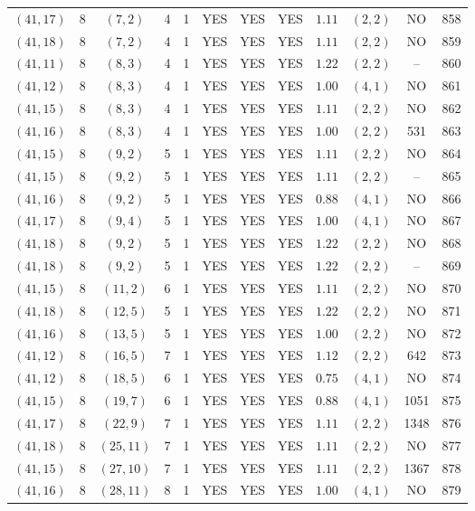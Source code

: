 \begin{longtable}{|c|c|c|c|c|c|c|c|c|c|c|c|}
$(41,17)$ & 8 & $(7,2)$ & 4 & 1 & YES & YES & YES & $1.11$ & $(2,2)$ & NO & 858\\
$(41,18)$ & 8 & $(7,2)$ & 4 & 1 & YES & YES & YES & $1.11$ & $(2,2)$ & NO & 859\\
$(41,11)$ & 8 & $(8,3)$ & 4 & 1 & YES & YES & YES & $1.22$ & $(2,2)$ & -- & 860\\
$(41,12)$ & 8 & $(8,3)$ & 4 & 1 & YES & YES & YES & $1.00$ & $(4,1)$ & NO & 861\\
$(41,15)$ & 8 & $(8,3)$ & 4 & 1 & YES & YES & YES & $1.11$ & $(2,2)$ & NO & 862\\
$(41,16)$ & 8 & $(8,3)$ & 4 & 1 & YES & YES & YES & $1.00$ & $(2,2)$ & 531 & 863\\
$(41,15)$ & 8 & $(9,2)$ & 5 & 1 & YES & YES & YES & $1.11$ & $(2,2)$ & NO & 864\\
$(41,15)$ & 8 & $(9,2)$ & 5 & 1 & YES & YES & YES & $1.11$ & $(2,2)$ & -- & 865\\
$(41,16)$ & 8 & $(9,2)$ & 5 & 1 & YES & YES & YES & $0.88$ & $(4,1)$ & NO & 866\\
$(41,17)$ & 8 & $(9,4)$ & 5 & 1 & YES & YES & YES & $1.00$ & $(4,1)$ & NO & 867\\
$(41,18)$ & 8 & $(9,2)$ & 5 & 1 & YES & YES & YES & $1.22$ & $(2,2)$ & NO & 868\\
$(41,18)$ & 8 & $(9,2)$ & 5 & 1 & YES & YES & YES & $1.22$ & $(2,2)$ & -- & 869\\
$(41,15)$ & 8 & $(11,2)$ & 6 & 1 & YES & YES & YES & $1.11$ & $(2,2)$ & NO & 870\\
$(41,18)$ & 8 & $(12,5)$ & 5 & 1 & YES & YES & YES & $1.22$ & $(2,2)$ & NO & 871\\
$(41,16)$ & 8 & $(13,5)$ & 5 & 1 & YES & YES & YES & $1.00$ & $(2,2)$ & NO & 872\\
$(41,12)$ & 8 & $(16,5)$ & 7 & 1 & YES & YES & YES & $1.12$ & $(2,2)$ & 642 & 873\\
$(41,12)$ & 8 & $(18,5)$ & 6 & 1 & YES & YES & YES & $0.75$ & $(4,1)$ & NO & 874\\
$(41,15)$ & 8 & $(19,7)$ & 6 & 1 & YES & YES & YES & $0.88$ & $(4,1)$ & 1051 & 875\\
$(41,17)$ & 8 & $(22,9)$ & 7 & 1 & YES & YES & YES & $1.11$ & $(2,2)$ & 1348 & 876\\
$(41,18)$ & 8 & $(25,11)$ & 7 & 1 & YES & YES & YES & $1.11$ & $(2,2)$ & NO & 877\\
$(41,15)$ & 8 & $(27,10)$ & 7 & 1 & YES & YES & YES & $1.11$ & $(2,2)$ & 1367 & 878\\
$(41,16)$ & 8 & $(28,11)$ & 8 & 1 & YES & YES & YES & $1.00$ & $(4,1)$ & NO & 879\\

\end{longtable}

